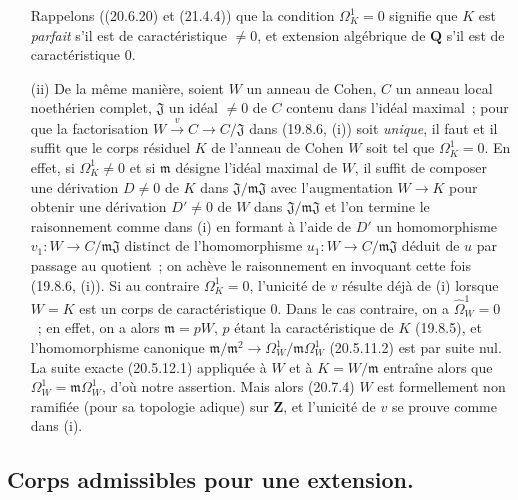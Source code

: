 \begin{remarks}[21.5.3]
\begin{enumerate}
  Rappelons ((20.6.20) et (21.4.4)) que la condition $\Omega^1_K=0$ signifie
  que $K$ est \emph{parfait} s'il est de caractéristique $\ne0$, et extension
  algébrique de $\mathbf Q$ s'il est de caractéristique $0$.
  \item[(ii)] De la même manière, soient $W$ un anneau de Cohen, $C$ un anneau
  local noethérien complet, $\mathfrak J$ un idéal $\ne0$ de $C$ contenu dans
  l'idéal maximal~; pour que la factorisation $W\xrightarrow{v}C\to C/\mathfrak J$
  dans (19.8.6, (i)) soit \emph{unique}, il faut et il suffit que le corps résiduel
  $K$ de l'anneau de Cohen $W$ soit tel que $\Omega^1_K=0$. En effet, si
  $\Omega^1_K\ne0$ et si $\mathfrak m$ désigne l'idéal maximal de $W$, il
  suffit de composer une dérivation $D\ne0$ de $K$ dans
  $\mathfrak J/\mathfrak m\mathfrak J$ avec l'augmentation $W\to K$ pour
  obtenir une dérivation $D'\ne0$ de $W$ dans
  $\mathfrak J/\mathfrak m\mathfrak J$ et l'on termine le raisonnement comme
  dans (i) en formant à l'aide de $D'$ un homomorphisme
  $v_1:W\to C/\mathfrak m\mathfrak J$ distinct de l'homomorphisme
  $u_1:W\to C/\mathfrak m\mathfrak J$ déduit de $u$ par passage au quotient~;
  on achève le raisonnement en invoquant cette fois (19.8.6, (i)). Si au
  contraire $\Omega^1_K=0$, l'unicité de $v$ résulte déjà de (i) lorsque
  $W=K$ est un corps de caractéristique $0$. Dans le cas contraire, on a
  $\widehat{\Omega}^1_W=0$~; en effet, on a alors $\mathfrak m=pW$, $p$ étant
  la caractéristique de $K$ (19.8.5), et l'homomorphisme canonique
  $\mathfrak m/\mathfrak m^2\to\Omega^1_W/\mathfrak m\Omega^1_W$ (20.5.11.2)
  est par suite nul. La suite exacte (20.5.12.1) appliquée à $W$ et à
  $K=W/\mathfrak m$ entraîne alors que $\Omega^1_W=\mathfrak m\Omega^1_W$,
  d'où notre assertion. Mais alors (20.7.4) $W$ est formellement non ramifiée
  (pour sa topologie adique) sur $\mathbf Z$, et l'unicité de $v$ se prouve
  comme dans (i).
\end{enumerate}
\end{remarks}

\subsection{Corps admissibles pour une extension.}
\label{section:0.21.6-fr}

